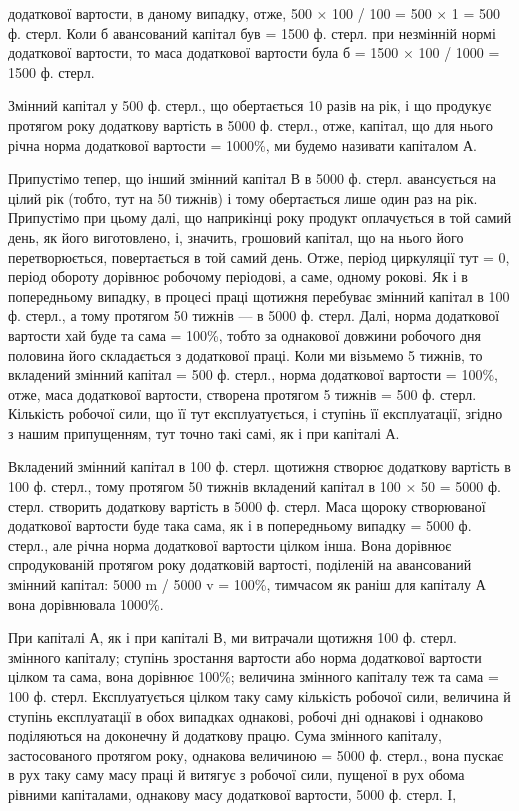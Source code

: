 додаткової вартости, в даному випадку, отже, 500 × 100 / 100 = 500 × 1 = 500 ф. стерл. Коли б
авансований капітал був = 1500 ф. стерл. при незмінній
нормі додаткової вартости, то маса додаткової вартости була б =
1500 × 100 / 1000 = 1500 ф. стерл.

Змінний капітал у 500 ф. стерл., що обертається 10 разів на рік, і
що продукує протягом року додаткову вартість в 5000 ф. стерл., отже,
капітал, що для нього річна норма додаткової вартости = 1000\%, ми
будемо називати капіталом А.

Припустімо тепер, що інший змінний капітал В в 5000 ф. стерл.
авансується на цілий рік (тобто, тут на 50 тижнів) і тому обертається
лише один раз на рік. Припустімо при цьому далі, що наприкінці року
продукт оплачується в той самий день, як його виготовлено, і, значить,
грошовий капітал, що на нього його перетворюється, повертається в той
самий день. Отже, період циркуляції тут = 0, період обороту дорівнює
робочому періодові, а саме, одному рокові. Як і в попередньому випадку,
в процесі праці щотижня перебуває змінний капітал в 100 ф. стерл.,
а тому протягом 50 тижнів — в 5000 ф. стерл. Далі, норма додаткової
вартости хай буде та сама = 100\%, тобто за однакової довжини робочого
дня половина його складається з додаткової праці. Коли ми візьмемо
5 тижнів, то вкладений змінний капітал = 500 ф. стерл., норма додаткової
вартости = 100\%, отже, маса додаткової вартости, створена протягом
5 тижнів = 500 ф. стерл. Кількість робочої сили, що її тут експлуатується,
і ступінь її експлуатації, згідно з нашим припущенням, тут
точно такі самі, як і при капіталі А.

Вкладений змінний капітал в 100 ф. стерл. щотижня створює додаткову
вартість в 100 ф. стерл., тому протягом 50 тижнів вкладений капітал
в 100 × 50 = 5000 ф. стерл. створить додаткову вартість в 5000 ф. стерл. Маса щороку створюваної
додаткової вартости буде така сама, як і в попередньому випадку = 5000 ф. стерл., але річна норма
додаткової
вартости цілком інша. Вона дорівнює спродукованій протягом року
додатковій вартості, поділеній на авансований змінний капітал:
5000 m / 5000 v = 100\%, тимчасом як раніш для капіталу А вона дорівнювала 1000\%.

При капіталі А, як і при капіталі В, ми витрачали щотижня 100 ф. стерл. змінного капіталу; ступінь
зростання вартости або норма додаткової
вартости цілком та сама, вона дорівнює 100\%; величина змінного
капіталу теж та сама = 100 ф. стерл. Експлуатується цілком таку
саму кількість робочої сили, величина й ступінь експлуатації в обох випадках
однакові, робочі дні однакові і однаково поділяються на доконечну
й додаткову працю. Сума змінного капіталу, застосованого протягом
року, однакова величиною = 5000 ф. стерл., вона пускає в рух таку
саму масу праці й витягує з робочої сили, пущеної в рух обома рівними
капіталами, однакову масу додаткової вартости, 5000 ф. стерл. І,
